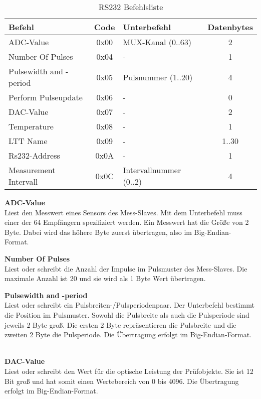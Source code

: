 \begin{table}[H]
\begin{center}
\begin{tabularx}{\textwidth}{|X|c|X|c|}\hline 
 Befehl & Code & Unterbefehl & Datenbytes \\ \hline \hline
 ADC-Value & 0x00 & MUX-Kanal (0..63) & 2  \\ \hline
 Number Of Pulses & 0x04 & - & 1  \\ \hline
 Pulsewidth and -period & 0x05 & Pulsnummer (1..20) & 4  \\ \hline
 Perform Pulseupdate & 0x06 & - & 0   \\ \hline
 DAC-Value & 0x07 & - & 2 \\ \hline
 Temperature & 0x08 & - & 1  \\ \hline
 LTT Name & 0x09 & - & 1..30  \\ \hline
 Rs232-Address & 0x0A & - & 1 \\ \hline
 Measurement Intervall & 0x0C & Intervallnummer (0..2) & 4 \\ \hline
\end{tabularx}
\caption{RS232 Befehlsliste}
\label{table_RS232Commands}
\end{center}
\end{table}

\textbf{ADC-Value}\\
Liest den Messwert eines Sensors des Mess-Slaves. Mit dem Unterbefehl muss einer der 64 Empfängern spezifiziert werden. Ein Messwert hat die Größe von 2 Byte. Dabei wird das höhere Byte zuerst übertragen, also im Big-Endian-Format.\ 

\textbf{Number Of Pulses}\\
Liest oder schreibt die Anzahl der Impulse im Pulsmuster des Mess-Slaves. Die maximale Anzahl ist 20 und sie wird als 1 Byte Wert übertragen.\ 

\textbf{Pulsewidth and -period}\\
Liest oder schreibt  ein Pulsbreiten-/Pulsperiodenpaar. Der Unterbefehl bestimmt die Position im Pulsmuster. Sowohl die Pulsbreite als auch die Pulsperiode sind jeweils 2 Byte groß. Die ersten 2 Byte repräsentieren die Pulsbreite und die zweiten 2 Byte die Pulsperiode. Die Übertragung erfolgt im Big-Endian-Format. \ 

\textbf{DAC-Value}\\
Liest oder schreibt den Wert für die optische Leistung der Prüfobjekte. Sie ist 12 Bit groß und hat somit einen Wertebereich von 0 bis 4096. Die Übertragung erfolgt im Big-Endian-Format.\ 


